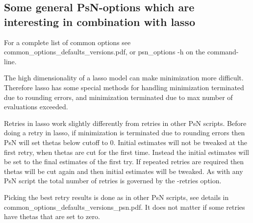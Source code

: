 \subsection{Some general PsN-options which are interesting in combination with lasso}

For a complete list of common options see common\_options\_defaults\_versions.pdf, or psn\_options -h on the command-line.

The high dimensionality of a lasso model can make minimization more difficult. Therefore lasso has some special methods for handling minimization terminated due to rounding errors, and minimization terminated due to max number of evaluations exceeded.

Retries in lasso work slightly differently from retries in other PsN scripts. Before doing a retry in lasso, if minimization is terminated due to rounding errors then PsN will set thetas below cutoff to 0. Initial estimates will not be tweaked at the first retry, when thetas are cut for the first time. Instead the initial estimates will be set to the final estimates of the first try. If repeated retries are required then thetas will be cut again and then initial estimates will be tweaked. As with any PsN script the total number of retries is governed by the -retries option. 

Picking the best retry results is done as in other PsN scripts, see details in common\_options\_defaults\_versions\_psn.pdf. It does not matter if some retries have thetas that are set to zero.

